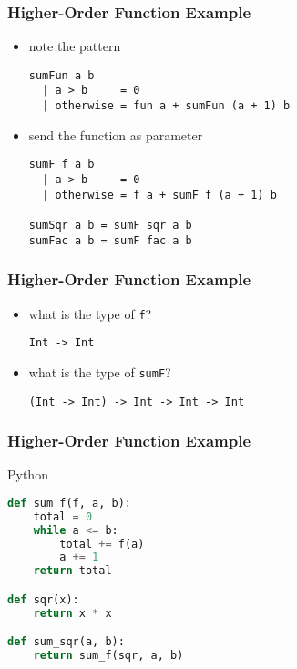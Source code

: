 \documentclass[dvipsnames]{beamer}
\theoremstyle{plain}
\begin{document}
\begin{frame}[fragile]
  \frametitle{Higher-Order Function Example}

  \begin{exampleblock}{}
    \begin{itemize}
      \item note the pattern

      \smallskip
      \begin{lstlisting}
sumFun a b
  | a > b     = 0
  | otherwise = fun a + sumFun (a + 1) b
      \end{lstlisting}
    \end{itemize}
  \end{exampleblock}

  \pause
  \begin{exampleblock}{}
    \begin{itemize}
      \item send the function as parameter

      \smallskip
      \begin{lstlisting}
sumF f a b
  | a > b     = 0
  | otherwise = f a + sumF f (a + 1) b

sumSqr a b = sumF sqr a b
sumFac a b = sumF fac a b
      \end{lstlisting}
    \end{itemize}
  \end{exampleblock}
\end{frame}

\begin{frame}[fragile]
  \frametitle{Higher-Order Function Example}

  \begin{exampleblock}{}
    \begin{itemize}
      \item what is the type of \lstinline|f|?
      \smallskip
      \begin{lstlisting}
Int -> Int
      \end{lstlisting}

      \pause
      \item what is the type of \lstinline|sumF|?
      \smallskip
      \begin{lstlisting}
(Int -> Int) -> Int -> Int -> Int
      \end{lstlisting}
    \end{itemize}
  \end{exampleblock}
\end{frame}

\begin{frame}[fragile]
  \frametitle{Higher-Order Function Example}

  \begin{exampleblock}{Python}
    \begin{lstlisting}[language=Python]
def sum_f(f, a, b):
    total = 0
    while a <= b:
        total += f(a)
        a += 1
    return total

def sqr(x):
    return x * x

def sum_sqr(a, b):
    return sum_f(sqr, a, b)
    \end{lstlisting}
  \end{exampleblock}
\end{frame}
\end{document}

